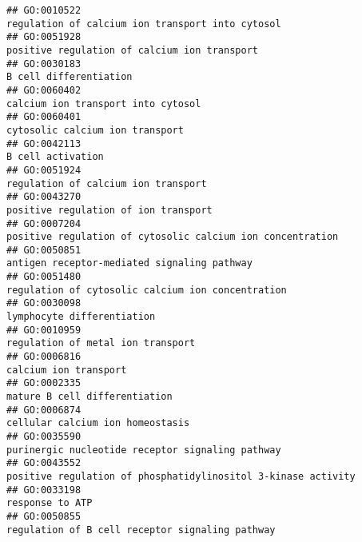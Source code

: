 \documentclass[
]{article}
\begin{document}
\begin{verbatim}
## GO:0010522                                                                          regulation of calcium ion transport into cytosol
## GO:0051928                                                                              positive regulation of calcium ion transport
## GO:0030183                                                                                                    B cell differentiation
## GO:0060402                                                                                        calcium ion transport into cytosol
## GO:0060401                                                                                           cytosolic calcium ion transport
## GO:0042113                                                                                                         B cell activation
## GO:0051924                                                                                       regulation of calcium ion transport
## GO:0043270                                                                                      positive regulation of ion transport
## GO:0007204                                                                positive regulation of cytosolic calcium ion concentration
## GO:0050851                                                                               antigen receptor-mediated signaling pathway
## GO:0051480                                                                         regulation of cytosolic calcium ion concentration
## GO:0030098                                                                                                lymphocyte differentiation
## GO:0010959                                                                                         regulation of metal ion transport
## GO:0006816                                                                                                     calcium ion transport
## GO:0002335                                                                                             mature B cell differentiation
## GO:0006874                                                                                          cellular calcium ion homeostasis
## GO:0035590                                                                          purinergic nucleotide receptor signaling pathway
## GO:0043552                                                             positive regulation of phosphatidylinositol 3-kinase activity
## GO:0033198                                                                                                           response to ATP
## GO:0050855                                                                           regulation of B cell receptor signaling pathway

\end{verbatim}
\end{document}
